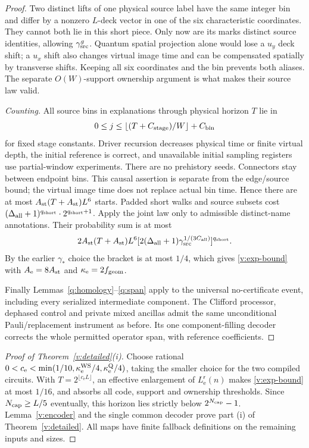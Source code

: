 \begin{proof}
Two distinct lifts of one physical source label have the same integer bin and
differ by a nonzero \(L\)-deck vector in one of the six characteristic
coordinates. They cannot both lie in this short piece. Only now are its
marks distinct source identities, allowing \(\gamma_{\rm src}^g\).
Quantum spatial projection alone would lose a \(u_y\) deck shift;
a \(u_x\) shift also changes virtual image time and can be compensated
spatially by transverse shifts. Keeping all six coordinates and the bin
prevents both aliases. The separate \(O(W)\)-support ownership argument
is what makes their source law valid.

\emph{Counting.} All source bins in explanations through physical horizon \(T\) lie in
\[
 0\le j\le\lfloor(T+C_{\rm stage})/W\rfloor+C_{\rm bin}
\]
for fixed stage constants. Driver recursion decreases physical time or
finite virtual depth, the initial reference is correct, and unavailable
initial sampling registers use partial-window experiments. There are no prehistory
seeds. Connectors stay between endpoint bins. This causal assertion is
separate from the edge/source bound; the virtual image time does not
replace actual bin time. Hence there are at most
\(A_{\rm st}(T+A_{\rm st})L^6\) starts. Padded short walks and source subsets cost
\((\Delta_{\rm all}+1)^{q_{\rm short}}\cdot2^{q_{\rm short}+1}\).
Apply the joint law only to admissible distinct-name annotations. Their
probability sum is at most
\[
 2A_{\rm st}(T+A_{\rm st})L^6
 [2(\Delta_{\rm all}+1)\gamma_{\rm src}^{1/(3C_{\rm all})}]^{q_{\rm short}}.
\]
By the earlier \(\gamma_*\) choice the bracket is at most \(1/4\),
which gives \eqref{v:exp-bound} with \(A_{\rm e}=8A_{\rm st}\) and
\(\kappa_{\rm e}=2f_{\rm geom}\).

Finally Lemmas~\ref{q:homology}--\ref{q:span} apply to the universal
no-certificate event, including every serialized intermediate component.
The Clifford processor, dephased control and private mixed ancillas admit
the same unconditional Pauli/replacement instrument as before. Its one
component-filling decoder corrects the whole permitted operator span,
with reference coefficients.
\end{proof}

\begin{proof}[Proof of Theorem~\ref{v:detailed}(i)]

Choose rational
\(0<c_{\mathrm e}<\min(1/10,\kappa_{\rm e}^{\mathrm{WS}}/4,\kappa_{\rm e}^{\mathrm Q}/4)\), taking the smaller
choice for the two compiled circuits. With \(T=2^{\lfloor c_{\mathrm e}L\rfloor}\),
an effective enlargement of \(L_{\mathrm e}^{\mathsf r}(n)\) makes
\eqref{v:exp-bound} at most \(1/16\), and absorbs all code, support and
ownership thresholds. Since \(N_{\rm cap}\ge L/5\) eventually, this
horizon lies strictly below \(2^{N_{\rm cap}}-1\). Lemma~\ref{v:encoder}
and the single common decoder prove part (i) of
Theorem~\ref{v:detailed}. All maps have finite fallback definitions on
the remaining inputs and sizes.
\end{proof}
